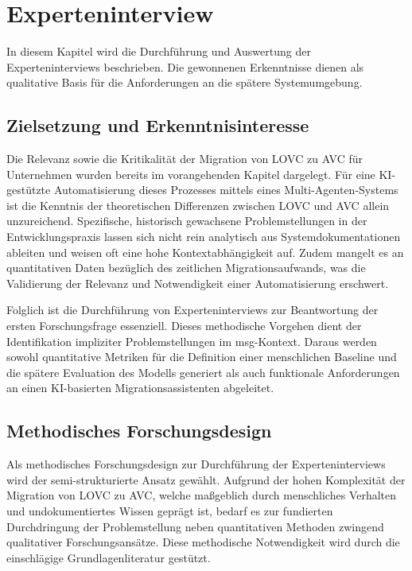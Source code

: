 \chapter{Experteninterview}
\label{ch:experteninterview}

In diesem Kapitel wird die Durchführung und Auswertung der Experteninterviews beschrieben. Die gewonnenen Erkenntnisse dienen als qualitative Basis für die Anforderungen an die spätere Systemumgebung.

\section{Zielsetzung und Erkenntnisinteresse}
\label{sec:zielsetzung}
Die Relevanz sowie die Kritikalität der Migration von LOVC zu AVC für Unternehmen wurden bereits im vorangehenden Kapitel dargelegt. Für eine KI-gestützte Automatisierung dieses Prozesses mittels eines Multi-Agenten-Systems ist die Kenntnis der theoretischen Differenzen zwischen LOVC und AVC allein unzureichend. Spezifische, historisch gewachsene Problemstellungen in der Entwicklungspraxis lassen sich nicht rein analytisch aus Systemdokumentationen ableiten und weisen oft eine hohe Kontextabhängigkeit auf. Zudem mangelt es an quantitativen Daten bezüglich des zeitlichen Migrationsaufwands, was die Validierung der Relevanz und Notwendigkeit einer Automatisierung erschwert.

Folglich ist die Durchführung von Experteninterviews zur Beantwortung der ersten Forschungsfrage essenziell. Dieses methodische Vorgehen dient der Identifikation impliziter Problemstellungen im msg-Kontext. Daraus werden sowohl quantitative Metriken für die Definition einer menschlichen Baseline und die spätere Evaluation des Modells generiert als auch funktionale Anforderungen an einen KI-basierten Migrationsassistenten abgeleitet.


\section{Methodisches Forschungsdesign}
\label{sec:forschungsdesign}
Als methodisches Forschungsdesign zur Durchführung der Experteninterviews wird der semi-strukturierte Ansatz gewählt. Aufgrund der hohen Komplexität der Migration von LOVC zu AVC, welche maßgeblich durch menschliches Verhalten und undokumentiertes Wissen geprägt ist, bedarf es zur fundierten Durchdringung der Problemstellung neben quantitativen Methoden zwingend qualitativer Forschungsansätze. Diese methodische Notwendigkeit wird durch die einschlägige Grundlagenliteratur gestützt. \parencite{seamanQualitativeMethodsEmpirical1999}

